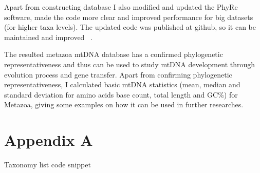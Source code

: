 \documentclass[a4paper,11pt]{article}
\begin{document}
Apart from constructing database I also modified and updated the PhyRe software, made the code more clear and improved performance for big datasets (for higher taxa levels). The updated code was published at github, so it can be maintained and improved ~\cite{metmitdb}.

The resulted metazoa mtDNA database has a confirmed phylogenetic representativeness and thus can be used to study mtDNA development through evolution process and gene transfer. Apart from confirming phylogenetic representativeness, I calculated basic mtDNA statistics (mean, median and standard deviation for amino acids base count, total length and GC\%) for Metazoa, giving some examples on how it can be used in further researches.


\clearpage
\printbibliography

\clearpage
\section{Appendix A}
Taxonomy list code snippet
\end{document}
